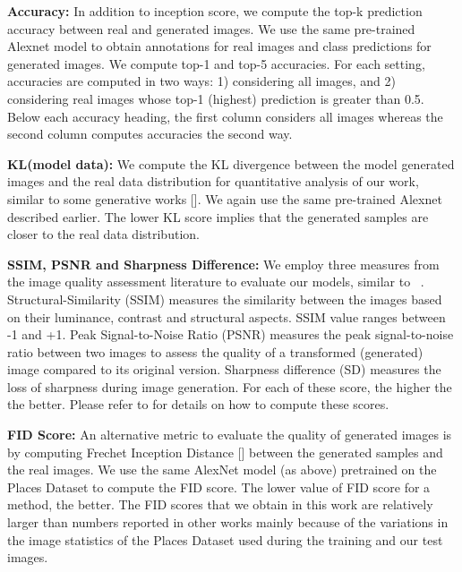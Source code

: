 \documentclass[times,twocolumn,final,authoryear]{elsarticle_modified}
\begin{document}
\noindent \textbf{Accuracy:} In addition to inception score, we compute the top-k prediction accuracy between real and generated images. We use the same pre-trained Alexnet model to obtain annotations for real images and class predictions for generated images. We compute top-1 and top-5 accuracies. For each setting, accuracies are computed in two ways: 1) considering all images, and 2) considering real images whose top-1 (highest) prediction is greater than 0.5. Below each accuracy heading, the first column considers all images whereas the second column computes accuracies the second way. 

\noindent \textbf{KL(model  data):} 
We compute the KL divergence between the model generated images and the real data distribution for quantitative analysis of our work, similar to some generative works [\cite{che-2016-reg-gan, nguyen2017dual}]. We again use the same pre-trained Alexnet described earlier. The lower KL score implies that the generated samples are closer to the real data distribution. 

\noindent \textbf{SSIM, PSNR and Sharpness Difference:}
We employ three measures from the image quality assessment literature to evaluate our models, similar to ~\cite{DBLP:journals/corr/MathieuCL15, DBLP:conf/cvpr/LedigTHCCAATTWS17,DBLP:conf/cvpr/ShiCHTABRW16,DBLP:journals/corr/ParkYYCB17}. Structural-Similarity (SSIM) measures the similarity between the images based on their luminance, contrast and structural aspects. SSIM value ranges between -1 and +1. Peak Signal-to-Noise Ratio (PSNR) measures the peak signal-to-noise ratio between two images to assess the quality of a transformed (generated) image compared to its original version. Sharpness difference (SD) measures the loss of sharpness during image generation. For each of these score, the higher the the better. Please refer to \cite{Regmi_2018_CVPR} for details on how to compute these scores.

\noindent \textbf{FID Score:} An alternative metric to evaluate the quality of generated images is by computing Frechet Inception Distance [\cite{NIPS2017_7240}] between the generated samples and the real images. We use the same AlexNet model (as above) pretrained on the Places Dataset to compute the FID score. The lower value of FID score for a method, the better. The FID scores that we obtain in this work are relatively larger than numbers reported in other works mainly because of the variations in the image statistics of the Places Dataset used during the training and our test images.
\end{document}
